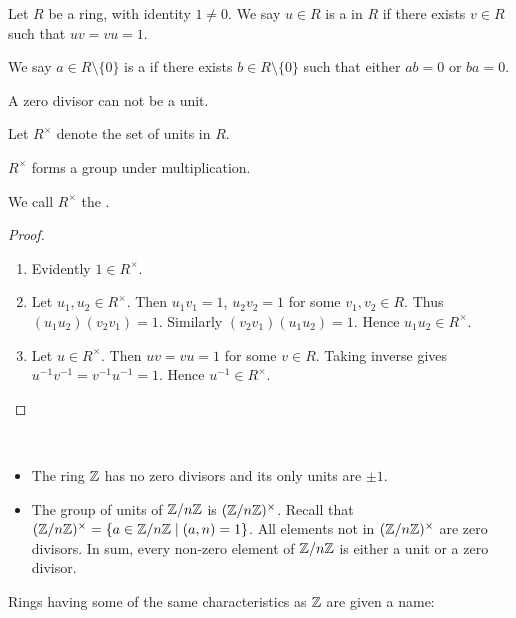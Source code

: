 \begin{definition}
Let $R$ be a ring, with identity $1\neq0$. We say $u\in R$ is a  in $R$ if there exists $v\in R$ such that $uv=vu=1$.

We say $a\in R\setminus\{0\}$ is a  if there exists $b\in R\setminus\{0\}$ such that either $ab=0$ or $ba=0$.
\end{definition}

\begin{remark}
A zero divisor can not be a unit.
\end{remark}

Let $R^\times$ denote the set of units in $R$.

\begin{lemma*}
$R^\times$ forms a group under multiplication.
\end{lemma*}

We call $R^\times$ the .

\begin{proof} \
\begin{enumerate}[label=(\roman*)]
\item Evidently $1\in R^\times$.
\item Let $u_1,u_2\in R^\times$. Then $u_1v_1=1$, $u_2v_2=1$ for some $v_1,v_2\in R$. Thus $(u_1u_2)(v_2v_1)=1$. Similarly $(v_2v_1)(u_1u_2)=1$. Hence $u_1u_2\in R^\times$.
\item Let $u\in R^\times$. Then $uv=vu=1$ for some $v\in R$. Taking inverse gives $u^{-1}v^{-1}=v^{-1}u^{-1}=1$. Hence $u^{-1}\in R^\times$.
\end{enumerate}
\end{proof}

\begin{example} \
\begin{itemize}
\item The ring $\mathbb Z$ has no zero divisors and its only units are $\pm1$.
\item The group of units of $\mathbb Z/n\mathbb Z$ is $(\mathbb Z/n\mathbb Z)^\times$. Recall that $(\mathbb Z/n\mathbb Z)^\times=\{a\in\mathbb Z/n\mathbb Z\mid(a,n)=1\}$. All elements not in $(\mathbb Z/n\mathbb Z)^\times$ are zero divisors. In sum, every non-zero element of $\mathbb Z/n\mathbb Z$ is either a unit or a zero divisor.
\end{itemize}
\end{example}

Rings having some of the same characteristics as $\mathbb Z$ are given a name:

